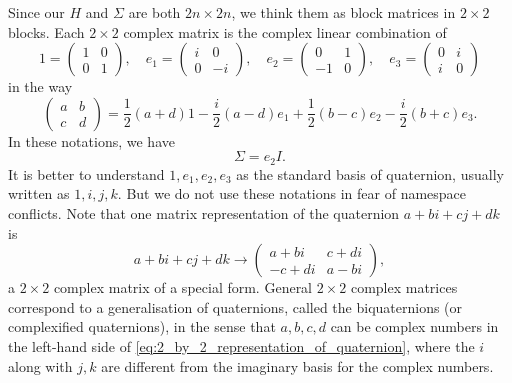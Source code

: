 \documentclass[11pt, a4paper]{article}
\numberwithin{equation}{section}
\theoremstyle{definition}
\theoremstyle{remark}
\begin{document}
Since our $H$ and $\Sigma$ are both $2n \times 2n$, we think them as block matrices in $2 \times 2$ blocks. Each $2 \times 2$ complex matrix is the complex linear combination of
\begin{equation}
  1 =
  \begin{pmatrix}
    1 & 0 \\
    0 & 1
  \end{pmatrix}, \quad
  e_1 =
  \begin{pmatrix}
    i & 0 \\
    0 & -i
  \end{pmatrix}, \quad
  e_2 =
  \begin{pmatrix}
    0 & 1 \\
    -1 & 0
  \end{pmatrix}, \quad
  e_3 =
  \begin{pmatrix}
    0 & i \\
    i & 0
  \end{pmatrix}
\end{equation}
in the way
\begin{equation}
  \begin{pmatrix}
    a & b \\
    c & d
  \end{pmatrix}
  = \frac{1}{2}(a + d) 1 - \frac{i}{2}(a - d) e_1 + \frac{1}{2}(b - c) e_2 - \frac{i}{2}(b + c) e_3.
\end{equation}
In these notations, we have
\begin{equation} \label{eq:quaternionic_expr_of_Sigma}
  \Sigma = e_2 I.
\end{equation}
It is better to understand $1, e_1, e_2, e_3$ as the standard basis of quaternion, usually written as $1, i, j, k$. But we do not use these notations in fear of namespace conflicts. Note that one matrix representation of the quaternion $a + bi + cj + dk$ is
\begin{equation} \label{eq:2_by_2_representation_of_quaternion}
  a + bi + cj + dk \to
  \begin{pmatrix}
    a + bi & c + di \\
    -c + di & a - bi
  \end{pmatrix},
\end{equation}
a $2 \times 2$ complex matrix of a special form. General $2 \times 2$ complex matrices correspond to a generalisation of quaternions, called the biquaternions (or complexified quaternions), in the sense that $a, b, c, d$ can be complex numbers in the left-hand side of \eqref{eq:2_by_2_representation_of_quaternion}, where the $i$ along with $j,k$ are different from the imaginary basis for the complex numbers.
\end{document}
